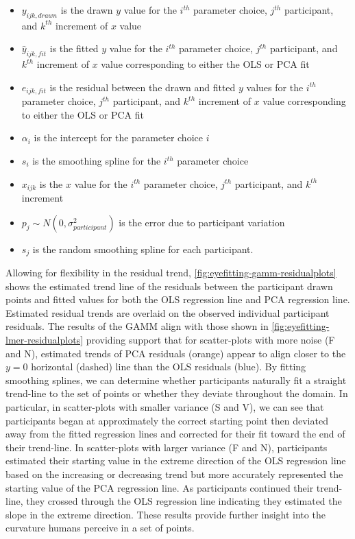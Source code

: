 \documentclass[12pt]{article}
\providecommand{\tightlist}{%
  \setlength{\itemsep}{0pt}\setlength{\parskip}{0pt}}
\begin{document}
\begin{itemize}
\tightlist
\item
  \(y_{ijk,drawn}\) is the drawn \(y\) value for the \(i^{th}\)
  parameter choice, \(j^{th}\) participant, and \(k^{th}\) increment of
  \(x\) value
\item
  \(\hat y_{ijk,fit}\) is the fitted \(y\) value for the \(i^{th}\)
  parameter choice, \(j^{th}\) participant, and \(k^{th}\) increment of
  \(x\) value corresponding to either the OLS or PCA fit
\item
  \(e_{ijk,fit}\) is the residual between the drawn and fitted \(y\)
  values for the \(i^{th}\) parameter choice, \(j^{th}\) participant,
  and \(k^{th}\) increment of \(x\) value corresponding to either the
  OLS or PCA fit
\item
  \(\alpha_i\) is the intercept for the parameter choice \(i\)
\item
  \(s_{i}\) is the smoothing spline for the \(i^{th}\) parameter choice
\item
  \(x_{ijk}\) is the \(x\) value for the \(i^{th}\) parameter choice,
  \(j^{th}\) participant, and \(k^{th}\) increment
\item
  \(p_{j} \sim N(0, \sigma^2_{participant})\) is the error due to
  participant variation
\item
  \(s_{j}\) is the random smoothing spline for each participant.
\end{itemize}

Allowing for flexibility in the residual trend,
\cref{fig:eyefitting-gamm-residualplots} shows the estimated trend line
of the residuals between the participant drawn points and fitted values
for both the OLS regression line and PCA regression line. Estimated
residual trends are overlaid on the observed individual participant
residuals. The results of the GAMM align with those shown in
\cref{fig:eyefitting-lmer-residualplots} providing support that for
scatter-plots with more noise (F and N), estimated trends of PCA
residuals (orange) appear to align closer to the \(y=0\) horizontal
(dashed) line than the OLS residuals (blue). By fitting smoothing
splines, we can determine whether participants naturally fit a straight
trend-line to the set of points or whether they deviate throughout the
domain. In particular, in scatter-plots with smaller variance (S and V),
we can see that participants began at approximately the correct starting
point then deviated away from the fitted regression lines and corrected
for their fit toward the end of their trend-line. In scatter-plots with
larger variance (F and N), participants estimated their starting value
in the extreme direction of the OLS regression line based on the
increasing or decreasing trend but more accurately represented the
starting value of the PCA regression line. As participants continued
their trend-line, they crossed through the OLS regression line
indicating they estimated the slope in the extreme direction. These
results provide further insight into the curvature humans perceive in a
set of points.
\end{document}

